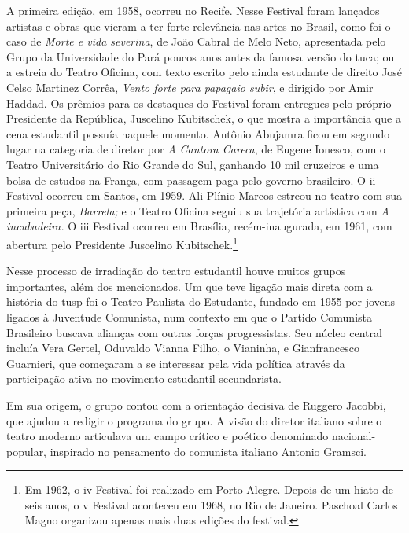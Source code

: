 A primeira edição, em 1958, ocorreu no Recife. Nesse Festival foram
lançados artistas e obras que vieram a ter forte relevância nas artes no
Brasil, como foi o caso de {\it Morte e vida severina}, de João Cabral
de Melo Neto, apresentada pelo Grupo da Universidade do Pará poucos anos
antes da famosa versão do {\sc tuca}; ou a estreia do Teatro Oficina, com
texto escrito pelo ainda estudante de direito José Celso Martinez
Corrêa, {\it Vento forte para papagaio subir}, e dirigido por Amir
Haddad. Os prêmios para os destaques do Festival foram entregues pelo
próprio Presidente da República, Juscelino Kubitschek, o que mostra a
importância que a cena estudantil possuía naquele momento. Antônio
Abujamra ficou em segundo lugar na categoria de diretor por {\it A
Cantora Careca}, de Eugene Ionesco, com o Teatro Universitário do Rio
Grande do Sul, ganhando 10 mil cruzeiros e uma bolsa de estudos na
França, com passagem paga pelo governo brasileiro. O {\sc ii} Festival ocorreu
em Santos, em 1959. Ali Plínio Marcos estreou no teatro com sua primeira
peça, {\it Barrela;} e o Teatro Oficina seguiu sua trajetória artística
com {\it A incubadeira.} O {\sc iii} Festival ocorreu em Brasília,
recém-inaugurada, em 1961, com abertura pelo Presidente Juscelino
Kubitschek.\footnote{Em 1962, o {\sc iv} Festival foi realizado em Porto
  Alegre. Depois de um hiato de seis anos, o {\sc v} Festival aconteceu em
  1968, no Rio de Janeiro. Paschoal Carlos Magno organizou apenas mais
  duas edições do festival.}

\subject{Estudantes e a ideia de nacional-popular: Teatro Paulista do
Estudante}

Nesse processo de irradiação do teatro estudantil houve muitos grupos
importantes, além dos mencionados. Um que teve ligação mais direta com a
história do {\sc tusp} foi o Teatro Paulista do Estudante, fundado em 1955 por
jovens ligados à Juventude Comunista, num contexto em que o Partido
Comunista Brasileiro buscava alianças com outras forças progressistas.
Seu núcleo central incluía Vera Gertel, Oduvaldo Vianna Filho, o
Vianinha, e Gianfrancesco Guarnieri, que começaram a se interessar pela
vida política através da participação ativa no movimento estudantil
secundarista.

Em sua origem, o grupo contou com a orientação decisiva de Ruggero
Jacobbi, que ajudou a redigir o programa do grupo. A visão do diretor
italiano sobre o teatro moderno articulava um campo crítico e poético
denominado nacional-popular, inspirado no pensamento do comunista
italiano Antonio Gramsci.

